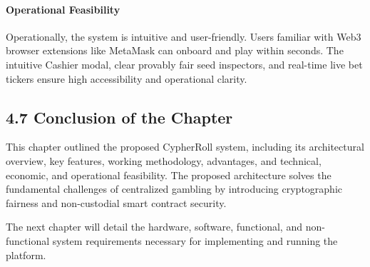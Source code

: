 \paragraph{Operational Feasibility}
Operationally, the system is intuitive and user-friendly. Users familiar with Web3 browser extensions like MetaMask can onboard and play within seconds. The intuitive Cashier modal, clear provably fair seed inspectors, and real-time live bet tickers ensure high accessibility and operational clarity.

\subsection*{4.7 Conclusion of the Chapter}
This chapter outlined the proposed CypherRoll system, including its architectural overview, key features, working methodology, advantages, and technical, economic, and operational feasibility. The proposed architecture solves the fundamental challenges of centralized gambling by introducing cryptographic fairness and non-custodial smart contract security.

The next chapter will detail the hardware, software, functional, and non-functional system requirements necessary for implementing and running the platform.
\label{chap:proposed_end}
